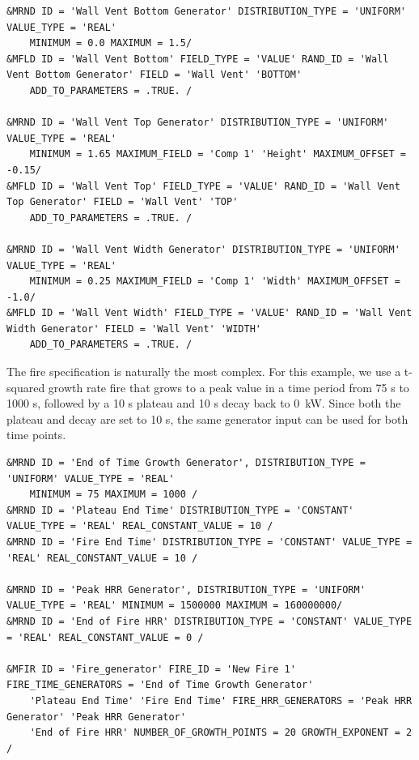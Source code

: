 \documentclass[12pt,twoside]{book}
\begin{document}
\vspace{\baselineskip}
\begin{lstlisting}
&MRND ID = 'Wall Vent Bottom Generator' DISTRIBUTION_TYPE = 'UNIFORM' VALUE_TYPE = 'REAL'
    MINIMUM = 0.0 MAXIMUM = 1.5/
&MFLD ID = 'Wall Vent Bottom' FIELD_TYPE = 'VALUE' RAND_ID = 'Wall Vent Bottom Generator' FIELD = 'Wall Vent' 'BOTTOM'
    ADD_TO_PARAMETERS = .TRUE. /

&MRND ID = 'Wall Vent Top Generator' DISTRIBUTION_TYPE = 'UNIFORM' VALUE_TYPE = 'REAL'
    MINIMUM = 1.65 MAXIMUM_FIELD = 'Comp 1' 'Height' MAXIMUM_OFFSET = -0.15/
&MFLD ID = 'Wall Vent Top' FIELD_TYPE = 'VALUE' RAND_ID = 'Wall Vent Top Generator' FIELD = 'Wall Vent' 'TOP'
    ADD_TO_PARAMETERS = .TRUE. /

&MRND ID = 'Wall Vent Width Generator' DISTRIBUTION_TYPE = 'UNIFORM' VALUE_TYPE = 'REAL'
    MINIMUM = 0.25 MAXIMUM_FIELD = 'Comp 1' 'Width' MAXIMUM_OFFSET = -1.0/
&MFLD ID = 'Wall Vent Width' FIELD_TYPE = 'VALUE' RAND_ID = 'Wall Vent Width Generator' FIELD = 'Wall Vent' 'WIDTH'
    ADD_TO_PARAMETERS = .TRUE. /
\end{lstlisting}

The fire specification is naturally the most complex. For this example, we use a t-squared growth rate fire that grows to a peak value in a time period from 75 s to 1000 s, followed by a 10 s plateau and 10 s decay back to 0~kW. Since both the plateau and decay are set to 10 s, the same generator input can be used for both time points.
\vspace{\baselineskip}
\begin{lstlisting}
&MRND ID = 'End of Time Growth Generator', DISTRIBUTION_TYPE = 'UNIFORM' VALUE_TYPE = 'REAL'
    MINIMUM = 75 MAXIMUM = 1000 /
&MRND ID = 'Plateau End Time' DISTRIBUTION_TYPE = 'CONSTANT' VALUE_TYPE = 'REAL' REAL_CONSTANT_VALUE = 10 /
&MRND ID = 'Fire End Time' DISTRIBUTION_TYPE = 'CONSTANT' VALUE_TYPE = 'REAL' REAL_CONSTANT_VALUE = 10 /

&MRND ID = 'Peak HRR Generator', DISTRIBUTION_TYPE = 'UNIFORM' VALUE_TYPE = 'REAL' MINIMUM = 1500000 MAXIMUM = 160000000/
&MRND ID = 'End of Fire HRR' DISTRIBUTION_TYPE = 'CONSTANT' VALUE_TYPE = 'REAL' REAL_CONSTANT_VALUE = 0 /

&MFIR ID = 'Fire_generator' FIRE_ID = 'New Fire 1' FIRE_TIME_GENERATORS = 'End of Time Growth Generator'
    'Plateau End Time' 'Fire End Time' FIRE_HRR_GENERATORS = 'Peak HRR Generator' 'Peak HRR Generator'
    'End of Fire HRR' NUMBER_OF_GROWTH_POINTS = 20 GROWTH_EXPONENT = 2 /
\end{lstlisting}
\end{document}
